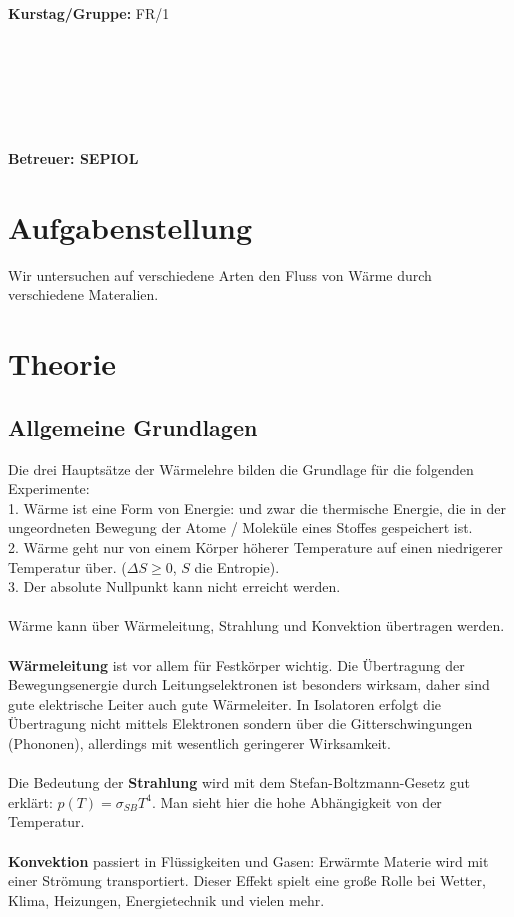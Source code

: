 \documentclass[12pt,a4paper,twopage]{article}
\begin{document}
\begin{verbatim}


\end{verbatim}
			\begin{flushleft}
			\textbf{\Large{Kurstag/Gruppe:}} \Large{FR/1}
			\end{flushleft}

\begin{verbatim}






\end{verbatim}
			\begin{flushleft}
			\LARGE{\textbf{Betreuer:\Large{ SEPIOL }}}		
			\end{flushleft}
			
\pagebreak
			
\section{Aufgabenstellung}
Wir untersuchen auf verschiedene Arten den Fluss von Wärme durch verschiedene Materalien.
\section{Theorie}
\subsection{Allgemeine Grundlagen}
Die drei Hauptsätze der Wärmelehre bilden die Grundlage für die folgenden Experimente:\\
1. Wärme ist eine Form von Energie: und zwar die thermische Energie, die in der ungeordneten Bewegung der Atome / Moleküle eines Stoffes gespeichert ist.\\
2. Wärme geht nur von einem Körper höherer Temperature auf einen niedrigerer Temperatur über. ($\Delta S \geq 0$, $S$ die Entropie).\\
3. Der absolute Nullpunkt kann nicht erreicht werden.\\
\\
Wärme kann über Wärmeleitung, Strahlung und Konvektion übertragen werden.\\
\\
\textbf{Wärmeleitung} ist vor allem für Festkörper wichtig. Die Übertragung der Bewegungsenergie durch Leitungselektronen ist besonders wirksam, daher sind gute elektrische Leiter auch gute Wärmeleiter. In Isolatoren erfolgt die Übertragung nicht mittels Elektronen sondern über die Gitterschwingungen (Phononen), allerdings mit wesentlich geringerer Wirksamkeit.\\
\\
Die Bedeutung der \textbf{Strahlung} wird mit dem Stefan-Boltzmann-Gesetz gut erklärt: $p(T)=\sigma_{SB} T^4$. Man sieht hier die hohe Abhängigkeit von der Temperatur.\\
\\
\textbf{Konvektion} passiert in Flüssigkeiten und Gasen: Erwärmte Materie wird mit einer Strömung transportiert. Dieser Effekt spielt eine große Rolle bei Wetter, Klima, Heizungen, Energietechnik und vielen mehr. 
\end{document}
